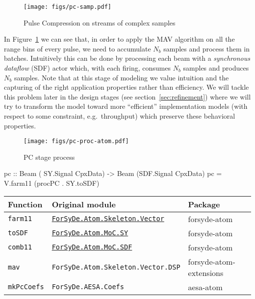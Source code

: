 \documentclass[
  a4paper,
]{article}
\newenvironment{Shaded}{}{}
\newcommand{\DataTypeTok}[1]{\textcolor[rgb]{0.56,0.13,0.00}{#1}}
\newcommand{\FunctionTok}[1]{\textcolor[rgb]{0.02,0.16,0.49}{#1}}
\newcommand{\NormalTok}[1]{#1}
\newcommand{\OtherTok}[1]{\textcolor[rgb]{0.00,0.44,0.13}{#1}}
\begin{document}
\begin{figure}
\hypertarget{fig:pc-samp}{%
\centering
\texttt{[image: figs/pc-samp.pdf]}
\caption{Pulse Compression on streams of complex
samples}\label{fig:pc-samp}
}
\end{figure}

In Figure~\ref{fig:pc-samp} we can see that, in order to apply the MAV
algorithm on all the range bins of every pulse, we need to accumulate
\(N_b\) samples and process them in batches. Intuitively this can be
done by processing each beam with a \emph{synchronous dataflow} (SDF)
actor which, with each firing, consumes \(N_b\) samples and produces
\(N_b\) samples. Note that at this stage of modeling we value intuition
and the capturing of the right application properties rather than
efficiency. We will tackle this problem later in the design stages (see
section~\ref{sec:refinement}) where we will try to transform the model
toward more ``efficient'' implementation models (with respect to some
constraint, e.g.~throughput) which preserve these behavioral properties.

\begin{figure}
\hypertarget{fig:pc-proc-atom}{%
\centering
\texttt{[image: figs/pc-proc-atom.pdf]}
\caption{PC stage process}\label{fig:pc-proc-atom}
}
\end{figure}

\begin{Shaded}
\begin{Highlighting}[numbers=left,,firstnumber=210,]
\OtherTok{pc ::} \DataTypeTok{Beam}\NormalTok{ ( }\DataTypeTok{SY.Signal} \DataTypeTok{CpxData}\NormalTok{)}
   \OtherTok{->} \DataTypeTok{Beam}\NormalTok{ (}\DataTypeTok{SDF.Signal} \DataTypeTok{CpxData}\NormalTok{)}
\NormalTok{pc }\FunctionTok{=}\NormalTok{ V.farm11 (procPC }\FunctionTok{.}\NormalTok{ SY.toSDF)}
\end{Highlighting}
\end{Shaded}

\begin{longtable}[]{@{}lll@{}}
\toprule
Function & Original module & Package\tabularnewline
\midrule
\endhead
\texttt{farm11} &
\href{https://forsyde.github.io/forsyde-atom/api/ForSyDe-Atom-Skeleton-Vector.html}{\texttt{ForSyDe.Atom.Skeleton.Vector}}
& forsyde-atom\tabularnewline
\texttt{toSDF} &
\href{https://forsyde.github.io/forsyde-atom/api/ForSyDe-Atom-MoC-SY.html}{\texttt{ForSyDe.Atom.MoC.SY}}
& forsyde-atom\tabularnewline
\texttt{comb11} &
\href{https://forsyde.github.io/forsyde-atom/api/ForSyDe-Atom-MoC-SDF.html}{\texttt{ForSyDe.Atom.MoC.SDF}}
& forsyde-atom\tabularnewline
\texttt{mav} & \texttt{ForSyDe.Atom.Skeleton.Vector.DSP} &
forsyde-atom-extensions\tabularnewline
\texttt{mkPcCoefs} & \texttt{ForSyDe.AESA.Coefs} &
aesa-atom\tabularnewline
\bottomrule
\end{longtable}
\end{document}
